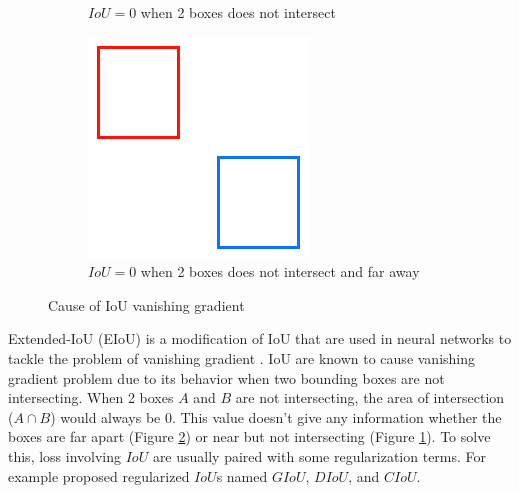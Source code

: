 \begin{figure}[H]
\begin{subfigure}[][][t]{0.3\textwidth}
        \caption{$IoU = 0$ when 2 boxes does not intersect}
        \label{fig:iou0near}
      \end{subfigure}\hfill
      \begin{subfigure}[][][t]{0.3\textwidth}
        \includegraphics[width=1\linewidth]{figures/iou0far.png}
        \caption{$IoU = 0$ when 2 boxes does not intersect and far away}
        \label{fig:iou0far}
      \end{subfigure}
      \caption{Cause of IoU vanishing gradient}
      \label{fig:iouvanishinggrad}
  \end{figure}
  Extended-IoU (EIoU) is a modification of IoU that are used in neural networks to tackle
  the problem of vanishing gradient \parencite{eiou}. 
  IoU are known to cause vanishing gradient problem due to its behavior when two bounding boxes are not intersecting.
  When 2 boxes $A$ and $B$ are not intersecting, the area of intersection ($A\cap B$) would always be 0.
  This value doesn't give any information whether the boxes are far apart (Figure \ref{fig:iou0far}) or 
  near but not intersecting (Figure \ref{fig:iou0near}).
  To solve this, loss involving $IoU$ are usually paired with some regularization terms.
  For example \textcites{giou}{diou_ciou} proposed regularized $IoU$s named $GIoU$, $DIoU$, and $CIoU$.
  
